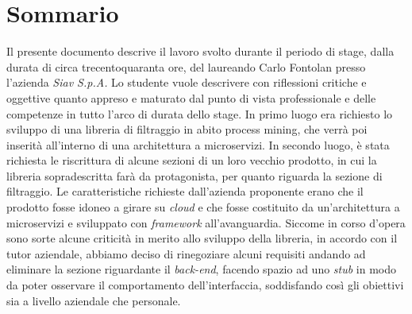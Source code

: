 
\cleardoublepage
{}
{}
\begingroup
\let\clearpage\relax
\let\cleardoublepage\relax
\let\cleardoublepage\relax

\chapter*{Sommario}

Il presente documento descrive il lavoro svolto durante il periodo di stage, dalla durata di circa trecentoquaranta ore, del laureando Carlo Fontolan presso l'azienda \textit{Siav S.p.A.}
Lo studente vuole descrivere con riflessioni critiche e oggettive quanto appreso e maturato dal punto di vista professionale e delle competenze in tutto l'arco di durata dello stage.
In primo luogo era richiesto lo sviluppo di una libreria di filtraggio in abito process mining, che verrà poi inserità all'interno di una architettura a microservizi.
In secondo luogo, è stata richiesta le riscrittura di alcune sezioni di un loro vecchio prodotto, in cui la libreria sopradescritta farà da protagonista, per quanto riguarda la sezione di filtraggio. Le caratteristiche richieste dall’azienda proponente erano che il prodotto fosse idoneo a girare su \textit{cloud} e che fosse costituito da un’architettura a microservizi e sviluppato con \textit{framework} all'avanguardia.
Siccome in corso d'opera sono sorte alcune criticità in merito allo sviluppo della libreria, in accordo con il tutor aziendale, abbiamo deciso di rinegoziare alcuni requisiti andando ad eliminare la sezione riguardante il  \textit{back-end}, facendo spazio ad uno \textit{stub} in modo da poter osservare il comportamento dell'interfaccia, soddisfando così gli obiettivi sia a livello aziendale che personale. 
